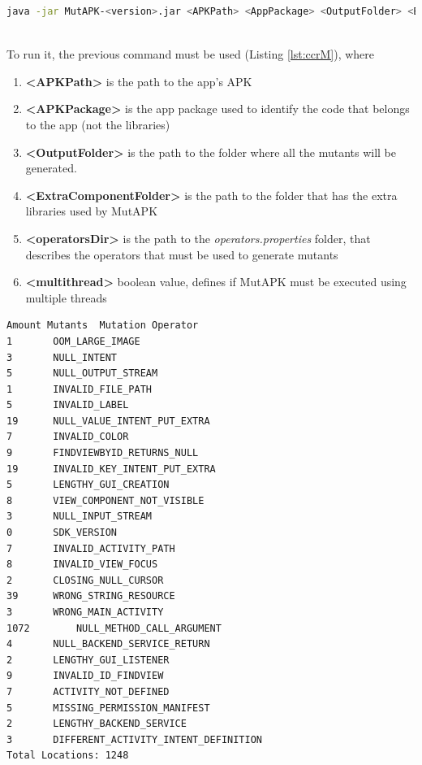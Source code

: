 \begin{minipage}{\linewidth}
	\begin{lstlisting}[language={sh}, label={lst:ccrM}, caption={Console command to run MutAPK}, numbers=none]
java -jar MutAPK-<version>.jar <APKPath> <AppPackage> <OutputFolder> <ExtraComponentFolder> <operatorsDir> <multithread>
	\end{lstlisting}
\end{minipage}\\

To run it, the previous command must be used (Listing \ref{lst:ccrM}),  where
\begin{enumerate}
	\item \textbf{<APKPath>} is the path to the app's APK
	\item \textbf{<APKPackage>} is the app package used to identify the code that belongs to the app (not the libraries)
	\item \textbf{<OutputFolder>} is the path to the folder where all the mutants will be generated.
	\item \textbf{<ExtraComponentFolder>} is the path to the folder that has the extra libraries used by MutAPK
	\item \textbf{<operatorsDir>} is the path to the \textit{operators.properties} folder, that describes the operators that must be used to generate mutants
	\item \textbf{<multithread>} boolean value, defines if MutAPK must be executed using multiple threads
\end{enumerate}
\begin{minipage}{\textwidth}
	\begin{lstlisting}[language={sh}, label={lst:eompa}, caption={Example Output of MutAPK for PhotoStream app}, numbers=none]
Amount Mutants	Mutation Operator
1		OOM_LARGE_IMAGE
3		NULL_INTENT
5		NULL_OUTPUT_STREAM
1		INVALID_FILE_PATH
5		INVALID_LABEL
19		NULL_VALUE_INTENT_PUT_EXTRA
7		INVALID_COLOR
9		FINDVIEWBYID_RETURNS_NULL
19		INVALID_KEY_INTENT_PUT_EXTRA
5		LENGTHY_GUI_CREATION
8		VIEW_COMPONENT_NOT_VISIBLE
3		NULL_INPUT_STREAM
0		SDK_VERSION
7		INVALID_ACTIVITY_PATH
8		INVALID_VIEW_FOCUS
2		CLOSING_NULL_CURSOR
39		WRONG_STRING_RESOURCE
3		WRONG_MAIN_ACTIVITY
1072		NULL_METHOD_CALL_ARGUMENT
4		NULL_BACKEND_SERVICE_RETURN
2		LENGTHY_GUI_LISTENER
9		INVALID_ID_FINDVIEW
7		ACTIVITY_NOT_DEFINED
5		MISSING_PERMISSION_MANIFEST
2		LENGTHY_BACKEND_SERVICE
3		DIFFERENT_ACTIVITY_INTENT_DEFINITION
Total Locations: 1248
	\end{lstlisting}
\end{minipage}\\

